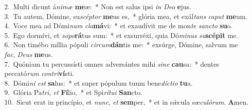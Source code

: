 {2.~}Multi dicunt á\textit{ni}\textit{mæ} \textbf{me}æ:~* Non est salus ipsi \textit{in} \textit{De}\textit{o} \textbf{e}jus.\\
{3.~}Tu autem, Dómine, su\textit{scép}\textit{tor} \textbf{me}us es,~* glória mea, et exál\textit{tans} \textit{ca}\textit{put} \textbf{me}um.\\
{4.~}Voce mea ad Dómi\textit{num} \textit{cla}\textbf{má}vi:~* et exaudívit me de mon\textit{te} \textit{san}\textit{cto} \textbf{su}o.\\
{5.~}Ego dormívi, et \textit{so}\textit{po}\textbf{rá}tus sum:~* et exsurréxi, quia Dó\textit{mi}\textit{nus} \textit{su}\textbf{scé}\textbf{pit} me.\\
{6.~}Non timébo míllia pópuli \textit{cir}\textit{cum}\textbf{dán}tis me:~* exsúrge, Dómine, salvum me \textit{fac}, \textit{De}\textit{us} \textbf{me}us.\\
{7.~}Quóniam tu percussísti omnes adversántes mihi \textit{si}\textit{ne} \textbf{cau}sa:~* dentes peccató\textit{rum} \textit{con}\textit{tri}\textbf{ví}sti.\\
{8.~}Dómi\textit{ni} \textit{est} \textbf{sa}lus:~* et super pópulum tuum bene\textit{dí}\textit{cti}\textit{o} \textbf{tu}a.\\
{9.~}Glória Pa\textit{tri}, \textit{et} \textbf{Fí}lio,~* et Spi\textit{rí}\textit{tu}\textit{i} \textbf{San}cto.\\
{10.~}Sicut erat in princípio, et \textit{nunc}, \textit{et} \textbf{sem}per,~* et in sǽcula sæ\textit{cu}\textit{ló}\textit{rum}. \textbf{A}men.\\
